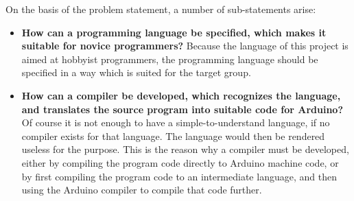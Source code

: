 On the basis of the problem statement, a number of sub-statements arise:
\begin{itemize}
	\item \textbf{How can a programming language be specified, which makes it suitable for novice programmers?} 
	Because the language of this project is aimed at hobbyist programmers, the programming language should be specified in a way which is suited for the target group.
	\item \textbf{How can a compiler be developed, which recognizes the language, and translates the source program into suitable code for Arduino?}
	Of course it is not enough to have a simple-to-understand language, if no compiler exists for that language. The language would then be rendered useless for the purpose. This is the reason why a compiler must be developed, either by compiling the program code directly to Arduino machine code, or by first compiling the program code to an intermediate language, and then using the Arduino compiler to compile that code further. 
\end{itemize}